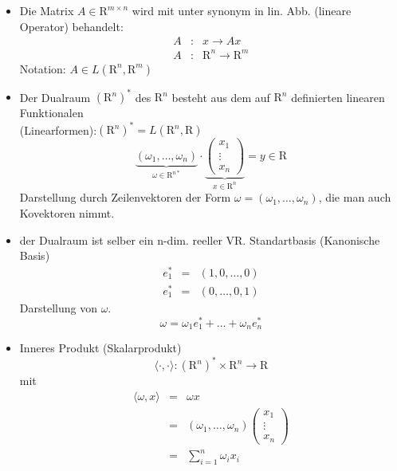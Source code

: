 \documentclass[ngerman]{tudscrreprt}
\begin{document}
\begin{itemize}
\item Die Matrix $A \in \mathrm{R}^{m\times n}$ wird mit unter synonym in lin. Abb. (lineare Operator) behandelt:
\begin{equation*}
\begin{matrix}
\textit{A}&: &x \to A x\\ 
\textit{A}&: &\mathrm{R}^n \to \mathrm{R}^m
\end{matrix}
\end{equation*}
Notation: $\textit{A}\in L (\mathrm{R}^n, \mathrm{R}^m)$
\item Der Dualraum $(\mathrm{R}^n)^*$ des $\mathrm{R}^n$ besteht aus dem auf $\mathrm{R}^n$ definierten linearen Funktionalen\\ (Linearformen):$(\mathrm{R}^n)^* = L(\mathrm{R}^n, \mathrm{R})$
\begin{equation*}
\underbrace{(\omega_1, \dots, \omega_n)}_{\omega\in \mathrm{R}^{n*}} \cdot 
\underbrace{\begin{pmatrix}
x_1 \\ \vdots\\ x_n
\end{pmatrix}
}_{x\in \mathrm{R}^n} = y \in \mathrm{R}
\end{equation*}
Darstellung durch Zeilenvektoren der Form $\omega = (\omega_1, \dots, \omega_n)$, die man auch Kovektoren nimmt.
\item der Dualraum ist selber ein n-dim. reeller VR. Standartbasis (Kanonische Basis)
\begin{equation*}
\begin{matrix}
e_1^* &=& (1, 0, \dots, 0)\\ 
e_1^* &=&(0, \dots, 0, 1)
\end{matrix}
\end{equation*}
Darstellung von $\omega$. \begin{equation*}
\omega= \omega_1 e_1^* + \dots + \omega_n e_n^*
\end{equation*}
\item Inneres Produkt (Skalarprodukt)
\begin{equation*}
\langle \cdot, \cdot \rangle : (\mathrm{R}^n)^* \times \mathrm{R}^n \to \mathrm{R}
\end{equation*}
mit 
\begin{equation*}
\begin{matrix}
\langle \omega, x\rangle &=&\omega x\\ 
&=&(\omega_1, \dots, \omega_n)\begin{pmatrix} x_1\\ \vdots\\ x_n \end{pmatrix}\\ 
&=& \sum\limits_{i=1}^n \omega_i x_i


\end{matrix}
\end{equation*}
\end{itemize}
\end{document}
